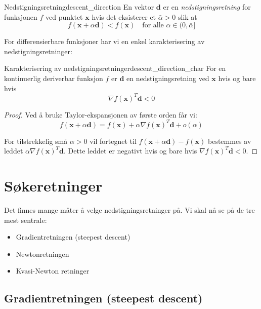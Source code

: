 \begin{definition}{Nedstigningsretning}{descent_direction}
	En vektor \(\symbf{d}\) er en \emph{nedstigningsretning} for funksjonen \(f\) ved punktet \(\symbf{x}\) hvis det eksisterer et \(\bar{\alpha} > 0\) slik at
	\[
		f(\symbf{x} + \alpha\symbf{d}) < f(\symbf{x}) \quad \text{for alle } \alpha \in (0,\bar{\alpha}]
	\]
\end{definition}

For differensierbare funksjoner har vi en enkel karakterisering av nedstigningsretninger:

\begin{proposition}{Karakterisering av nedstigningsretninger}{descent_direction_char}
	For en kontinuerlig deriverbar funksjon \(f\) er \(\symbf{d}\) en nedstigningsretning ved \(\symbf{x}\) hvis og bare hvis
	\[
		\nabla f(\symbf{x})^T\symbf{d} < 0
	\]
\end{proposition}

\begin{proof}{}{}
	Ved å bruke Taylor-ekspansjonen av første orden får vi:
	\[
		f(\symbf{x} + \alpha\symbf{d}) = f(\symbf{x}) + \alpha \nabla f(\symbf{x})^T\symbf{d} + o(\alpha)
	\]

	For tilstrekkelig små \(\alpha > 0\) vil fortegnet til \(f(\symbf{x} + \alpha\symbf{d}) - f(\symbf{x})\) bestemmes av leddet \(\alpha \nabla f(\symbf{x})^T\symbf{d}\). Dette leddet er negativt hvis og bare hvis \(\nabla f(\symbf{x})^T\symbf{d} < 0\).
\end{proof}

\section{Søkeretninger}
\label{sec:key_search_directions}

Det finnes mange måter å velge nedstigningsretninger på. Vi skal nå se på de tre mest sentrale:
\begin{itemize}
	\item Gradientretningen (steepest descent)
	\item Newtonretningen
	\item Kvasi-Newton retninger
\end{itemize}

\subsection{Gradientretningen (steepest descent)}
\label{subsec:steepest_descent}

